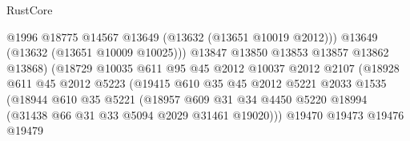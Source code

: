 \begin{lexlean}{RustCore}
\begin{coremodule}
                                            @1996
                                            @18775
                                            @14567
                                            @13649
                                            (@13632 (@13651 @10019 @2012)))
                                          @13649
                                          (@13632 (@13651 @10009 @10025)))
                                        @13847
                                        @13850
                                        @13853
                                        @13857
                                        @13862
                                        @13868)
                                      (@18729
                                        @10035
                                        @611
                                        @95
                                        @45
                                        @2012
                                        @10037
                                        @2012
                                        @2107
                                        (@18928
                                          @611
                                          @45
                                          @2012
                                          @5223
                                          (@19415
                                            @610
                                            @35
                                            @45
                                            @2012
                                            @5221
                                            @2033
                                            @1535
                                            (@18944
                                              @610
                                              @35
                                              @5221
                                              (@18957
                                                @609
                                                @31
                                                @34
                                                @4450
                                                @5220
                                                @18994
                                                (@31438 @66 @31 @33 @5094 @2029 @31461 @19020)))
                                            @19470
                                            @19473
                                            @19476
                                            @19479

\end{coremodule}
\end{lexlean}
